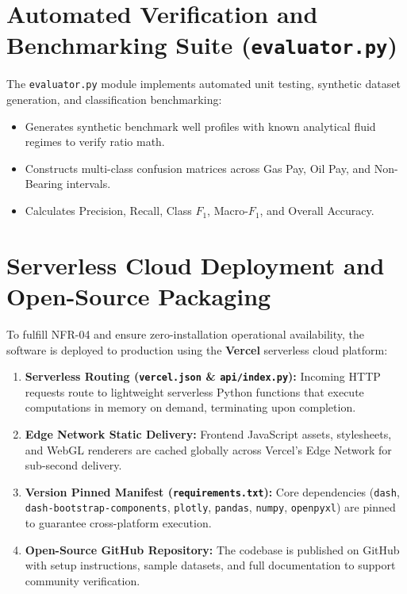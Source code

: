 \section{Automated Verification and Benchmarking Suite (\texttt{evaluator.py})}

The \texttt{evaluator.py} module implements automated unit testing, synthetic dataset generation, and classification benchmarking:
\begin{itemize}
    \item Generates synthetic benchmark well profiles with known analytical fluid regimes to verify ratio math.
    \item Constructs multi-class confusion matrices across Gas Pay, Oil Pay, and Non-Bearing intervals.
    \item Calculates Precision, Recall, Class $F_1$, Macro-$F_1$, and Overall Accuracy.
\end{itemize}

\section{Serverless Cloud Deployment and Open-Source Packaging}

To fulfill NFR-04 and ensure zero-installation operational availability, the software is deployed to production using the \textbf{Vercel} serverless cloud platform:
\begin{enumerate}
    \item \textbf{Serverless Routing (\texttt{vercel.json} \& \texttt{api/index.py}):} Incoming HTTP requests route to lightweight serverless Python functions that execute computations in memory on demand, terminating upon completion.
    \item \textbf{Edge Network Static Delivery:} Frontend JavaScript assets, stylesheets, and WebGL renderers are cached globally across Vercel's Edge Network for sub-second delivery.
    \item \textbf{Version Pinned Manifest (\texttt{requirements.txt}):} Core dependencies (\texttt{dash}, \texttt{dash-bootstrap-components}, \texttt{plotly}, \texttt{pandas}, \texttt{numpy}, \texttt{openpyxl}) are pinned to guarantee cross-platform execution.
    \item \textbf{Open-Source GitHub Repository:} The codebase is published on GitHub with setup instructions, sample datasets, and full documentation to support community verification.
\end{enumerate}
